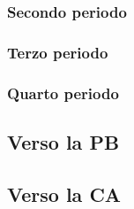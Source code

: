 \subsubsection{Secondo periodo}
\subsubsection{Terzo periodo}
\subsubsection{Quarto periodo}

\subsection{Verso la PB}

\subsection{Verso la CA}
